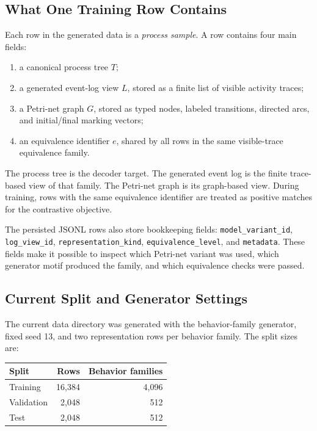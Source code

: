 \documentclass[manuscript,screen,nonacm]{acmart}
\begin{document}
\subsection{What One Training Row Contains}
\label{app:data-row}

Each row in the generated data is a \emph{process sample}. A row contains four
main fields:
\begin{enumerate}
  \item a canonical process tree $T$;
  \item a generated event-log view $L$, stored as a finite list of visible activity
        traces;
  \item a Petri-net graph $G$, stored as typed nodes, labeled transitions,
        directed arcs, and initial/final marking vectors;
  \item an equivalence identifier $e$, shared by all rows in the same
        visible-trace equivalence family.
\end{enumerate}
The process tree is the decoder target. The generated event log is the finite
trace-based view of that family. The Petri-net graph is its graph-based view.
During training, rows with the same equivalence identifier are treated as
positive matches for the contrastive objective.

The persisted JSONL rows also store bookkeeping fields:
\texttt{model\_variant\_id}, \texttt{log\_view\_id},
\texttt{representation\_kind}, \texttt{equivalence\_level}, and
\texttt{metadata}. These fields make it possible to inspect which Petri-net
variant was used, which generator motif produced the family, and which
equivalence checks were passed.

\subsection{Current Split and Generator Settings}
\label{app:data-settings}

The current data directory was generated with the behavior-family generator,
fixed seed 13, and two representation rows per behavior family. The split sizes
are:
\begin{center}
\small
\begin{tabular}{lrr}
\toprule
Split & Rows & Behavior families \\
\midrule
Training & 16{,}384 & 4{,}096 \\
Validation & 2{,}048 & 512 \\
Test & 2{,}048 & 512 \\
\bottomrule
\end{tabular}
\end{center}
\end{document}
